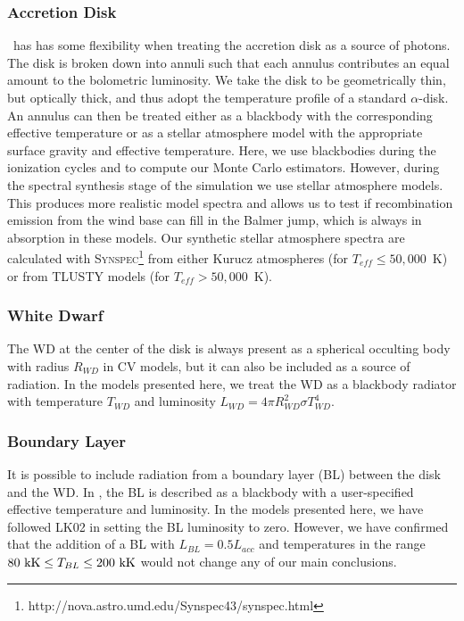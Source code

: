 \documentclass[preprint, a4paper, 11pt]{aastex}
\begin{document}
\subsubsection{Accretion Disk}

\py\ has has some flexibility when treating the accretion 
disk as a source of photons. The disk is broken down into annuli 
such that each annulus contributes an equal amount to the bolometric
luminosity. We take the disk to be geometrically thin, but optically
thick, and thus adopt the temperature profile of a standard
\cite{shakurasunyaev1973} $\alpha$-disk. An annulus can then
be treated either as a blackbody with the corresponding effective
temperature or as a stellar atmosphere model with the appropriate
surface gravity and effective temperature. Here, we use blackbodies 
during the ionization cycles and to compute our Monte Carlo
estimators. However, during the spectral synthesis stage of the 
simulation we use stellar atmosphere models. This produces more
realistic model spectra and allows us to test if recombination
emission from the wind base can fill in the Balmer jump, which is
always in absorption in these models. Our synthetic stellar atmosphere
spectra are calculated with
\textsc{Synspec}\footnote{http://nova.astro.umd.edu/Synspec43/synspec.html}
from either Kurucz \citep{kurucz1991} atmospheres (for $T_{eff} \leq
50,000$~K) or from \textsc{TLUSTY} models \citep{tlusty} (for $T_{eff} > 50,000$~K). 

\subsubsection{White Dwarf}

The WD at the center of the disk is always present as a spherical occulting
body with radius $R_{WD}$ in \py CV models, but it can also be included
as a source of radiation. In the models presented here, we treat the
WD as a blackbody radiator with temperature $T_{WD}$ and luminosity
$L_{WD} = 4\pi R_{WD}^2 \sigma T_{WD}^4$. 

\subsubsection{Boundary Layer}

It is possible to include radiation from a boundary layer (BL) between
the disk and the WD. In \py, the BL is described as
a blackbody with a user-specified effective temperature and
luminosity. In the models presented here, we have followed LK02 in setting
the BL luminosity to zero. However, we have confirmed that the addition of a
BL with $L_{BL} = 0.5 L_{acc}$ and temperatures in the range $80~{\rm
kK} \leq T_{BL} \leq 200~{\rm kK}$ would not change any of our main
conclusions. 
\end{document}
